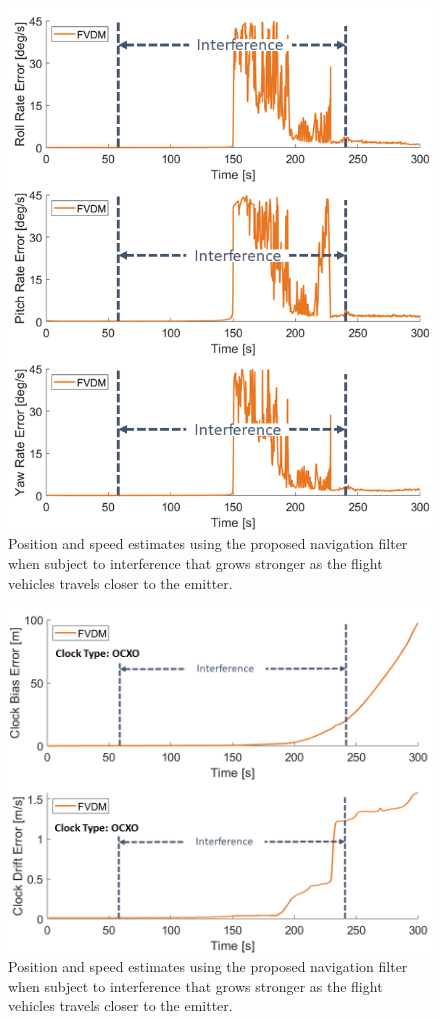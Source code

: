 \begin{figure}[!ht]
    \centering
    \includegraphics[width=0.75\linewidth]{Figures/Results/trajectoryfigure/Slide13.PNG}
    \caption{Position and speed estimates using the proposed navigation filter when subject to interference that grows stronger as the flight vehicles travels closer to the emitter.}\label{fig:AngScene2}
\end{figure}


\begin{figure}[!ht]
    \centering
    \includegraphics[width=0.75\linewidth]{Figures/Results/trajectoryfigure/Slide25.PNG}
    \caption{Position and speed estimates using the proposed navigation filter when subject to interference that grows stronger as the flight vehicles travels closer to the emitter.}\label{fig:ClkScene2}
\end{figure}


